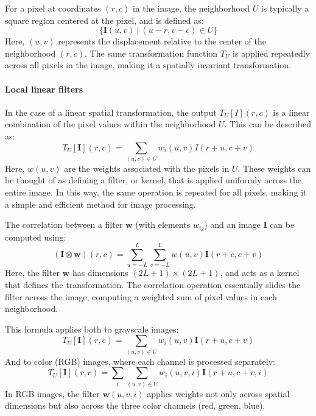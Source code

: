 For a pixel at coordinates $(r, c)$ in the image, the neighborhood $U$ is typically a square region centered at the pixel, and is defined as:
\[\{\mathbf{I}(u,v)\:|\:(u-r,v-c)\in U\}\]
Here, $(u, v)$ represents the displacement relative to the center of the neighborhood $(r, c)$.
The same transformation function $T_U$ is applied repeatedly across all pixels in the image, making it a spatially invariant transformation. 

\paragraph*{Local linear filters}
In the case of a linear spatial transformation, the output $T_U[I](r, c)$ is a linear combination of the pixel values within the neighborhood $U$. 
This can be described as:
\[T_U[\mathbf{I}](r,c)=\sum_{(u,v)\in U}w_i(u,v)I(r+u,c+v)\]
Here, $w(u, v)$ are the weights associated with the pixels in $U$.
These weights can be thought of as defining a filter, or kernel, that is applied uniformly across the entire image. 
In this way, the same operation is repeated for all pixels, making it a simple and efficient method for image processing.

The correlation between a filter $\mathbf{w}$ (with elements $w_{ij}$) and an image $\mathbf{I}$ can be computed using:
\[(\mathbf{I}\otimes \mathbf{w})(r,c)=\sum_{u=-L}^L\sum_{v=-L}^Lw(u,v)\mathbf{I}(r+c,c+v)\]
Here, the filter $\mathbf{w}$ has dimensions $(2L+1)\times(2L+1)$, and acts as a kernel that defines the transformation.
The correlation operation essentially slides the filter across the image, computing a weighted sum of pixel values in each neighborhood.

This formula applies both to grayscale images:
\[T_U[\mathbf{I}](r,c)=\sum_{(u,v)\in U}w_i(u,v)\mathbf{I}(r+u,c+v)\]
And to color (RGB) images, where each channel is processed separately:
\[T_U[\mathbf{I}](r,c)=\sum_i\sum_{(u,v)\in U}w_i(u,v,i)\mathbf{I}(r+u,c+v,i)\]
In RGB images, the filter $\mathbf{w}(u, v, i)$ applies weights not only across spatial dimensions but also across the three color channels (red, green, blue).